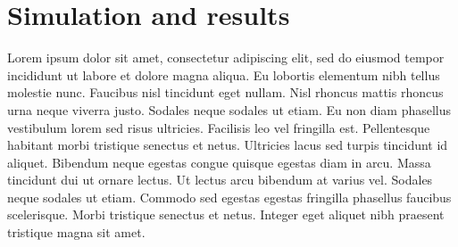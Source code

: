 \documentclass[]{article}
\begin{document}
\section{Simulation and results}
Lorem ipsum dolor sit amet, consectetur adipiscing elit, sed do eiusmod tempor incididunt ut labore et dolore magna aliqua. Eu lobortis elementum nibh tellus molestie nunc. Faucibus nisl tincidunt eget nullam. Nisl rhoncus mattis rhoncus urna neque viverra justo. Sodales neque sodales ut etiam. Eu non diam phasellus vestibulum lorem sed risus ultricies. Facilisis leo vel fringilla est. Pellentesque habitant morbi tristique senectus et netus. Ultricies lacus sed turpis tincidunt id aliquet. Bibendum neque egestas congue quisque egestas diam in arcu. Massa tincidunt dui ut ornare lectus. Ut lectus arcu bibendum at varius vel. Sodales neque sodales ut etiam. Commodo sed egestas egestas fringilla phasellus faucibus scelerisque. Morbi tristique senectus et netus. Integer eget aliquet nibh praesent tristique magna sit amet.
\end{document}
